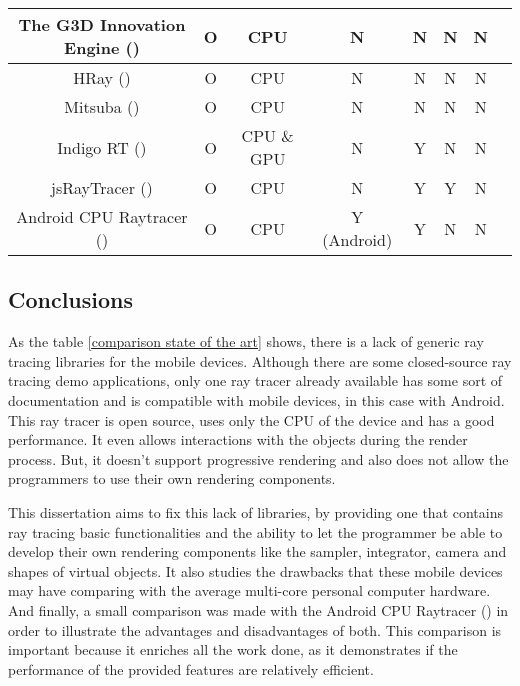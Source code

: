\begin{table}[H]
\begin{tabular}{|c|c|c|c|c|c|c|c|}
The G3D Innovation Engine (\cite{G3D17})						& O	& CPU 				& N				& N                 		& N                 		& N\\ \hline
HRay (\cite{HRay})										& O     	& CPU                		& N                  		& N                      	& N				& N\\ \hline
Mitsuba (\cite{Mitsuba})										& O 	& CPU 				& N				& N                 		& N				& N\\ \hline
Indigo RT (\cite{IndigoRT})									& O 	& CPU \& GPU		& N				& Y                 		& N				& N\\ \hline
jsRayTracer (\cite{jsRayTracer})								& O 	& CPU 				& N				& Y                 		& Y				& N\\ \hline
Android CPU Raytracer (\cite{Android_CPU_Raytracer})			& O 	& CPU 				& Y (Android)		& Y                 		& N				& N\\ \hline
\end{tabular}
\normalsize
\end{table}

\subsection{Conclusions}


\par
As the table \ref{comparison state of the art} shows, there is a lack of generic ray tracing libraries for the mobile devices.
Although there are some closed-source ray tracing demo applications, only one ray tracer already available has some sort of documentation and is compatible with mobile devices, in this case with Android.
This ray tracer is open source, uses only the CPU of the device and has a good performance.
It even allows interactions with the objects during the render process.
But, it doesn’t support progressive rendering and also does not allow the programmers to use their own rendering components.

\par
This dissertation aims to fix this lack of libraries, by providing one that contains ray tracing basic functionalities and the ability to let the programmer be able to develop their own rendering components like the sampler, integrator, camera and shapes of virtual objects.
It also studies the drawbacks that these mobile devices may have comparing with the average multi-core personal computer hardware.
And finally, a small comparison was made with the Android CPU Raytracer (\cite{Android_CPU_Raytracer}) in order to illustrate the advantages and disadvantages of both.
This comparison is important because it enriches all the work done, as it demonstrates if the performance of the provided features are relatively efficient.